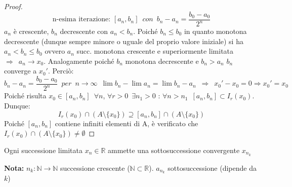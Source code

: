 \documentclass[10pt, oneside]{book}
\theoremstyle{plain}
\begin{document}
\begin{proof}
\[\textrm{n-esima iterazione: } [a_n, b_n] \enspace con \enspace b_n - a_n = \frac{b_0 - a_0}{2^n}\]
$a_n$ è crescente, $b_n$ decrescente con $a_n < b_n$. Poiché $b_n \leq b_0$ in quanto monotona decrescente (dunque sempre minore o uguale del proprio valore iniziale) si ha $a_n < b_n \leq b_0$ ovvero $a_n$ succ. monotona crescente e superiormente limitata $\Rightarrow \enspace a_n \longrightarrow x_0$. Analogamente poiché $b_n$ monotona decrescente e $b_n > a_n$ $b_n$ converge a $x_0'$. Perciò:
\[b_n - a_n = \frac{b_0 - a_0}{2^n} \enspace per \enspace n \rightarrow \infty \enspace \lim b_n - \lim a_n = \lim b_n - a_n \enspace \Rightarrow \enspace x_0' - x_0 = 0 \Rightarrow x_0' = x_0\]
Poiché risulta $x_0 \in [a_n, b_n] \enspace \forall n$, $\forall r > 0 \enspace \exists n_1 > 0$ : $\forall n > n_1 \enspace [a_n, b_n] \subset I_r(x_0)$. Dunque:
\[I_r(x_0) \cap (A \setminus \{x_0\}) \supseteq [a_n, b_n] \cap (A \setminus \{x_0\})\]
Poiché $[a_n, b_n]$ contiene infiniti elementi di A, è verificato che $I_r(x_0) \cap (A \setminus \{x_0\}) \neq \emptyset$
\end{proof}
\hypertarget{corollaier}{
\begin{cor}
Ogni successione limitata $x_n \in \mathbb{R}$ ammette una sottosuccessione convergente $x_{n_k}$
\end{cor}}
\textbf{Nota: } $n_k : \mathbb{N} \longrightarrow \mathbb{N}$ successione crescente ($\mathbb{N} \subset \mathbb{R}$). $a_{n_k}$ sottosuccessione (dipende da $k$)
\end{document}
